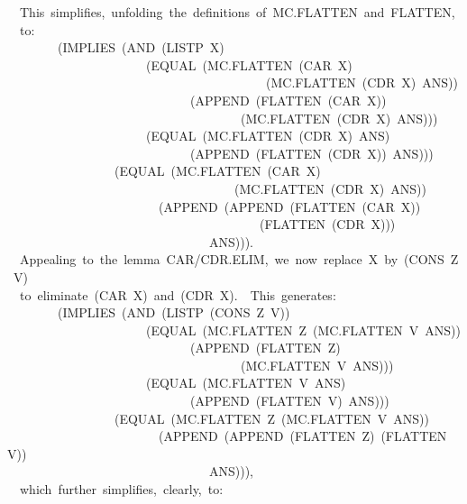\documentclass[11pt]{book}
\newenvironment{pubasis}{\begin{flushleft}\ttfamily\small}{\normalsize\rmfamily\end{flushleft}}
\begin{document}
\begin{pubasis}
~~This~simplifies,~unfolding~the~definitions~of~MC.FLAT\-TEN~and~FLAT\-TEN,\\
~~to:\\

~~~~~~~~(IMPLIES~(AND~(LISTP~X)\\
~~~~~~~~~~~~~~~~~~~~~~(EQUAL~(MC.FLAT\-TEN~(CAR~X)\\
~~~~~~~~~~~~~~~~~~~~~~~~~~~~~~~~~~~~~~~~~(MC.FLAT\-TEN~(CDR~X)~ANS))\\
~~~~~~~~~~~~~~~~~~~~~~~~~~~~~(APPEND~(FLATTEN~(CAR~X))\\
~~~~~~~~~~~~~~~~~~~~~~~~~~~~~~~~~~~~~(MC.FLAT\-TEN~(CDR~X)~ANS)))\\
~~~~~~~~~~~~~~~~~~~~~~(EQUAL~(MC.FLAT\-TEN~(CDR~X)~ANS)\\
~~~~~~~~~~~~~~~~~~~~~~~~~~~~~(APPEND~(FLATTEN~(CDR~X))~ANS)))\\
~~~~~~~~~~~~~~~~~(EQUAL~(MC.FLAT\-TEN~(CAR~X)\\
~~~~~~~~~~~~~~~~~~~~~~~~~~~~~~~~~~~~(MC.FLAT\-TEN~(CDR~X)~ANS))\\
~~~~~~~~~~~~~~~~~~~~~~~~(APPEND~(APPEND~(FLATTEN~(CAR~X))\\
~~~~~~~~~~~~~~~~~~~~~~~~~~~~~~~~~~~~~~~~(FLATTEN~(CDR~X)))\\
~~~~~~~~~~~~~~~~~~~~~~~~~~~~~~~~ANS))).\\

~~Appealing~to~the~lemma~CAR/CDR.ELIM,~we~now~replace~X~by~(CONS~Z~V)\\
~~to~eliminate~(CAR~X)~and~(CDR~X).~~This~generates:\\

~~~~~~~~(IMPLIES~(AND~(LISTP~(CONS~Z~V))\\
~~~~~~~~~~~~~~~~~~~~~~(EQUAL~(MC.FLAT\-TEN~Z~(MC.FLAT\-TEN~V~ANS))\\
~~~~~~~~~~~~~~~~~~~~~~~~~~~~~(APPEND~(FLATTEN~Z)\\
~~~~~~~~~~~~~~~~~~~~~~~~~~~~~~~~~~~~~(MC.FLAT\-TEN~V~ANS)))\\
~~~~~~~~~~~~~~~~~~~~~~(EQUAL~(MC.FLAT\-TEN~V~ANS)\\
~~~~~~~~~~~~~~~~~~~~~~~~~~~~~(APPEND~(FLATTEN~V)~ANS)))\\
~~~~~~~~~~~~~~~~~(EQUAL~(MC.FLAT\-TEN~Z~(MC.FLAT\-TEN~V~ANS))\\
~~~~~~~~~~~~~~~~~~~~~~~~(APPEND~(APPEND~(FLATTEN~Z)~(FLATTEN~V))\\
~~~~~~~~~~~~~~~~~~~~~~~~~~~~~~~~ANS))),\\

~~which~further~simplifies,~clearly,~to:\\


\end{pubasis}
\end{document}
